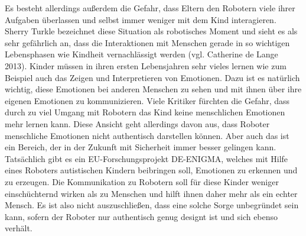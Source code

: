 \documentclass[12pt]{article}
\begin{document}
Es besteht allerdings außerdem die Gefahr, dass Eltern den Robotern viele ihrer Aufgaben überlassen und selbst immer weniger mit dem Kind interagieren. Sherry Turkle bezeichnet diese Situation als robotisches Moment und sieht es als sehr gefährlich an, dass die Interaktionen mit Menschen gerade in so wichtigen Lebensphasen wie Kindheit vernachlässigt werden (vgl. Catherine de Lange 2013). Kinder müssen in ihren ersten Lebensjahren sehr vieles lernen wie zum Beispiel auch das Zeigen und Interpretieren von Emotionen. Dazu ist es natürlich wichtig, diese Emotionen bei anderen Menschen zu sehen und mit ihnen über ihre eigenen Emotionen zu kommunizieren. Viele Kritiker fürchten die Gefahr, dass durch zu viel Umgang mit Robotern das Kind keine menschlichen Emotionen mehr lernen kann. Diese Ansicht geht allerdings davon aus, dass Roboter menschliche Emotionen nicht authentisch darstellen können. Aber auch das ist ein Bereich, der in der Zukunft mit Sicherheit immer besser gelingen kann. Tatsächlich gibt es ein EU-Forschungsprojekt DE-ENIGMA, welches mit Hilfe eines Roboters autistischen Kindern beibringen soll, Emotionen zu erkennen und zu erzeugen. Die Kommunikation zu Robotern soll für diese Kinder weniger einschüchternd wirken als zu Menschen und hilft ihnen daher mehr als ein echter Mensch. Es ist also nicht auszuschließen, dass eine solche Sorge unbegründet sein kann, sofern der Roboter nur authentisch genug designt ist und sich ebenso verhält.

%
%
\end{document}
